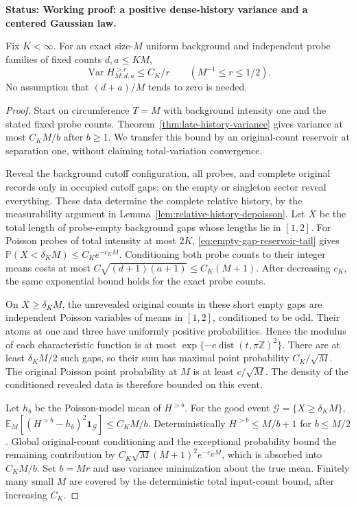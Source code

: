 \documentclass[11pt,letterpaper]{article}
\newcommand{\PP}{\mathbb P}\newcommand{\EE}{\mathbb E}
\newcommand{\ind}{\mathbf 1}\newcommand{\Exp}{\operatorname{Exp}}
\newcommand{\status}[1]{\textbf{Status: #1.}}
\begin{document}
\status{Working proof: a positive dense-history variance and a centered Gaussian law}

\begin{corollary}
\label{cor:dense-late-variance}
Fix $K<\infty$. For an exact size-$M$ uniform background
and independent probe families of fixed counts $d,a\le KM$,
\begin{equation}\label{eq:dense-late-variance}
 \operatorname{Var}H^{>r}_{M;d,a}\le C_K/r
                    \qquad(M^{-1}\le r\le1/2).
\end{equation}
No assumption that $(d+a)/M$ tends to zero is needed.
\end{corollary}
\begin{proof}
Start on circumference $T=M$ with background intensity one
and the stated fixed probe counts. Theorem~\ref{thm:late-history-variance}
gives variance at most $C_KM/b$ after $b\ge1$.
We transfer this bound by an original-count reservoir at
separation one, without claiming total-variation convergence.

Reveal the background cutoff configuration, all probes, and
complete original records only in occupied cutoff gaps; on
the empty or singleton sector reveal everything.
These data determine the complete relative history, by the
measurability argument in Lemma~\ref{lem:relative-history-depoisson}.
Let $X$ be the total length of probe-empty background gaps
whose lengths lie in $[1,2]$.
For Poisson probes of total intensity at most $2K$,
\eqref{eq:empty-gap-reservoir-tail} gives
$\PP(X<\delta_K M)\le C_Ke^{-c_KM}$.
Conditioning both probe counts to their integer means costs
at most $C\sqrt{(d+1)(a+1)}\le C_K(M+1)$.
After decreasing $c_K$, the same exponential bound holds
for the exact probe counts.

On $X\ge\delta_KM$, the unrevealed original counts in these
short empty gaps are independent Poisson variables of means
in $[1,2]$, conditioned to be odd. Their atoms at one and
three have uniformly positive probabilities. Hence the
modulus of each characteristic function is at most
$\exp\{-c\operatorname{dist}(t,\pi\mathbb Z)^2\}$.
There are at least $\delta_KM/2$ such gaps, so their sum has
maximal point probability $C_K/\sqrt M$.
The original Poisson point probability at $M$ is at least
$c/\sqrt M$. The density of the conditioned revealed data
is therefore bounded on this event.

Let $h_b$ be the Poisson-model mean of $H^{>b}$.
For the good event $\mathcal G=\{X\ge\delta_KM\}$,
$\EE_M[(H^{>b}-h_b)^2\ind_{\mathcal G}]\le C_KM/b$.
Deterministically $H^{>b}\le M/b+1$ for $b\le M/2$.
Global original-count conditioning and the exceptional
probability bound the remaining contribution by
$C_K\sqrt M(M+1)^2e^{-c_KM}$, which is absorbed into $C_KM/b$.
Set $b=Mr$ and use variance minimization about the true mean.
Finitely many small $M$ are covered by the deterministic
total input-count bound, after increasing $C_K$.
\end{proof}
\end{document}

